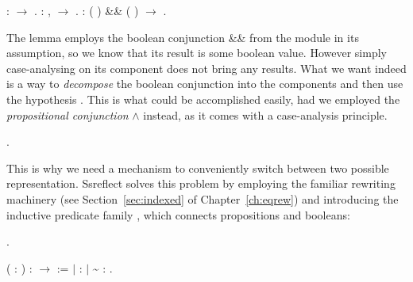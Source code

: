 \begin{coqdoccode}
\coqdocemptyline
\coqdocnoindent
{}   :  \ensuremath{\rightarrow} .\coqdoceol
\coqdocnoindent
{} : \coqdockw{\ensuremath{\forall}} ,   \ensuremath{\rightarrow}  .\coqdoceol
\coqdocemptyline
\coqdocnoindent
{}   : ( ) \&\& ( ) \ensuremath{\rightarrow}  .\coqdoceol
\coqdocemptyline
\end{coqdoccode}


The lemma  employs the boolean conjunction \&\& from the
 module in its assumption, so we know that its result is some
boolean value. However simply case-analysing on its component does not
bring any results. What we want indeed is a way to \textit{decompose} the
boolean conjunction into the components and then use the hypothesis
. This is what could be accomplished easily, had we employed the
\textit{propositional conjunction} \ensuremath{\land} instead, as it comes with a
case-analysis principle.




  \begin{coqdoccode}
\coqdocnoindent
{}.\coqdoceol
\coqdocemptyline
\end{coqdoccode}


This is why we need a mechanism to conveniently switch between two
possible representation. Ssreflect solves this problem by employing
the familiar rewriting machinery (see Section~\ref{sec:indexed} of
Chapter~\ref{ch:eqrew}) and introducing the inductive predicate
family , which connects propositions and booleans:




\begin{coqdoccode}
\coqdocemptyline
\coqdocnoindent
{} .\coqdoceol
\coqdocemptyline
\end{coqdoccode}
\coqdoceol
\coqdocemptyline
\coqdocnoindent
{}  ( : ) :  \ensuremath{\rightarrow}  :=\coqdoceol
\coqdocindent{1.00em}
\ensuremath{|}      :   \coqdoceol
\coqdocindent{1.00em}
\ensuremath{|}   \textasciitilde {} :   .

